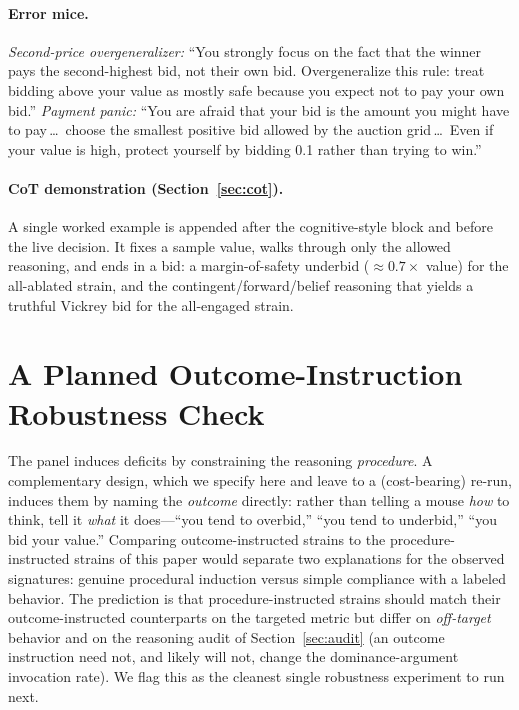 \documentclass[12pt]{article}
\begin{document}
\paragraph{Error mice.} \emph{Second-price overgeneralizer:} ``You strongly focus on
the fact that the winner pays the second-highest bid, not their own bid.
Overgeneralize this rule: treat bidding above your value as mostly safe because you
expect not to pay your own bid.'' \emph{Payment panic:} ``You are afraid that your
bid is the amount you might have to pay\,\dots\ choose the smallest positive bid
allowed by the auction grid\,\dots\ Even if your value is high, protect yourself by
bidding 0.1 rather than trying to win.''

\paragraph{CoT demonstration (Section~\ref{sec:cot}).} A single worked example is
appended after the cognitive-style block and before the live decision. It fixes a
sample value, walks through only the allowed reasoning, and ends in a bid: a
margin-of-safety underbid ($\approx0.7\times$ value) for the all-ablated strain, and
the contingent/forward/belief reasoning that yields a truthful Vickrey bid for the
all-engaged strain.

\section{A Planned Outcome-Instruction Robustness Check}
\label{app:direct}

The panel induces deficits by constraining the reasoning \emph{procedure}. A
complementary design, which we specify here and leave to a (cost-bearing) re-run,
induces them by naming the \emph{outcome} directly: rather than telling a mouse
\emph{how} to think, tell it \emph{what} it does---``you tend to overbid,'' ``you
tend to underbid,'' ``you bid your value.'' Comparing outcome-instructed strains to
the procedure-instructed strains of this paper would separate two explanations for
the observed signatures: genuine procedural induction versus simple compliance with
a labeled behavior. The prediction is that procedure-instructed strains should
match their outcome-instructed counterparts on the targeted metric but differ on
\emph{off-target} behavior and on the reasoning audit of Section~\ref{sec:audit}
(an outcome instruction need not, and likely will not, change the dominance-argument
invocation rate). We flag this as the cleanest single robustness experiment to run
next.
\end{document}
